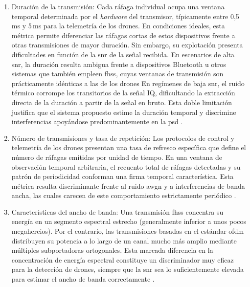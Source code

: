 \begin{enumerate}
 \item Duración de la transmisión: Cada ráfaga individual ocupa una ventana temporal determinada por el \textit{hardware} del transmisor, típicamente entre 0,5\,ms y 5\,ms para la telemetría de los drones. En condiciones ideales, esta métrica permite diferenciar las ráfagas cortas de estos dispositivos frente a otras transmisiones de mayor duración. Sin embargo, su explotación presenta dificultades en función de la \gls{snr} de la señal recibida. En escenarios de alta \gls{snr}, la duración resulta ambigua frente a dispositivos Bluetooth u otros sistemas que también empleen \gls{fhss}, cuyas ventanas de transmisión son prácticamente idénticas a las de los drones En regímenes de baja \gls{snr}, el ruido térmico corrompe los transitorios de la señal IQ, dificultando la extracción directa de la duración a partir de la señal en bruto. Esta doble limitación justifica que el sistema propuesto estime la duración temporal y discrimine interferencias apoyándose predominantemente en la \gls{psd} \cite{ezuma_detection_2020, rout_novel_2025}.

 \item Número de transmisiones y tasa de repetición: Los protocolos de control y telemetría de los drones presentan una tasa de refresco específica que define el número de ráfagas emitidas por unidad de tiempo. En una ventana de observación temporal arbitraria, el recuento total de ráfagas detectadas y su patrón de periodicidad conforman una firma temporal característica. Esta métrica resulta discriminante frente al ruido \gls{awgn} y a interferencias de banda ancha, las cuales carecen de este comportamiento estrictamente periódico \cite{ezuma_micro-uav_2019, vasant_ahirrao_rf-based_2024}.

 \item Características del ancho de banda: Una transmisión \gls{fhss} concentra su energía en un segmento espectral estrecho (generalmente inferior a unos pocos megahercios). Por el contrario, las transmisiones basadas en el estándar \gls{ofdm} distribuyen su potencia a lo largo de un canal mucho más amplio mediante múltiples subportadoras ortogonales. Esta marcada diferencia en la concentración de energía espectral constituye un discriminador muy eficaz para la detección de drones, siempre que la \gls{snr} sea lo suficientemente elevada para estimar el ancho de banda correctamente \cite{ezuma_detection_2020}.
\end{enumerate}

